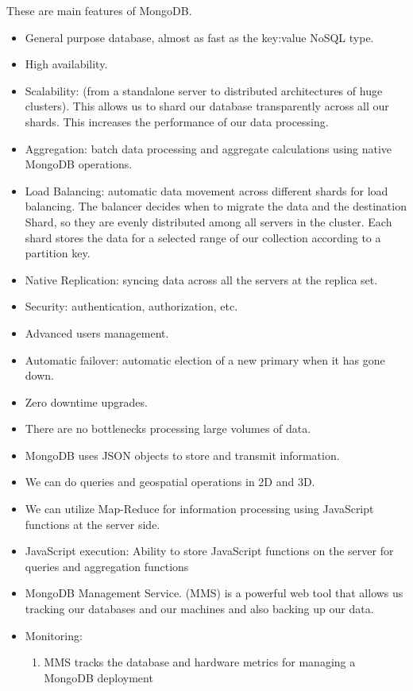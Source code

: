\documentclass[9pt,twocolumn,twoside]{../../styles/osajnl}
\begin{document}
These are main features of MongoDB.\cite{www-mongo11}
\begin{itemize}
\item General purpose database, almost as fast as the key:value NoSQL type.

\item High availability.
\item Scalability: (from a standalone server to distributed architectures of huge clusters). This allows us to shard our database transparently across all our shards. This increases the performance of our data processing.
\item Aggregation: batch data processing and aggregate calculations using native MongoDB operations.
\item Load Balancing: automatic data movement across different shards for load balancing. The balancer decides when to migrate the data and the destination Shard, so they are evenly distributed among all servers in the cluster. Each shard stores the data for a selected range of our collection according to a partition key.
\item Native Replication: syncing data across all the servers at the replica set.
\item Security: authentication, authorization, etc.
\item Advanced users management.
\item Automatic failover: automatic election of a new primary when it has gone down.
\item Zero downtime upgrades.
\item There are no bottlenecks processing large volumes of data.
\item MongoDB uses JSON objects to store and transmit information. 
\item We can do queries and geospatial operations in 2D and 3D.
\item We can utilize Map-Reduce for information processing using JavaScript functions at the server side.
\item JavaScript execution: Ability to store JavaScript functions on the server for queries and aggregation functions
\item MongoDB Management Service. (MMS) is a powerful web tool that allows us tracking our databases and our machines and also backing up our data.
\item Monitoring:
\begin{enumerate}
    \item MMS tracks the database and hardware metrics for managing a MongoDB deployment

\end{enumerate}
\end{itemize}
\end{document}
